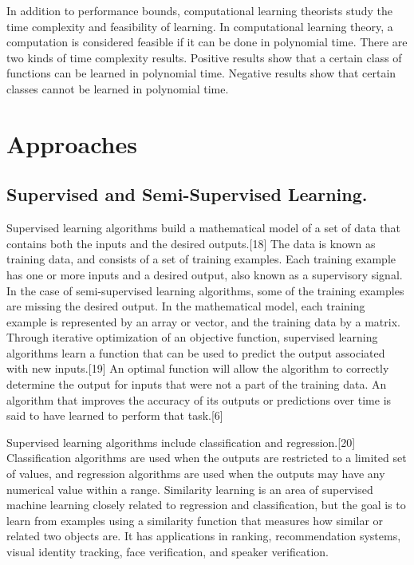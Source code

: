 \documentclass[utf8,bachelor,english]{gradu3}
\begin{document}
In addition to performance bounds, computational learning theorists study the time complexity and feasibility of learning. In computational learning theory, a computation is considered feasible if it can be done in polynomial time. There are two kinds of time complexity results. Positive results show that a certain class of functions can be learned in polynomial time. Negative results show that certain classes cannot be learned in polynomial time.
\chapter{Approaches}

\section{Supervised and Semi-Supervised Learning.}
Supervised learning algorithms build a mathematical model of a set of data that contains both the inputs and the desired outputs.[18] The data is known as training data, and consists of a set of training examples. Each training example has one or more inputs and a desired output, also known as a supervisory signal. In the case of semi-supervised learning algorithms, some of the training examples are missing the desired output. In the mathematical model, each training example is represented by an array or vector, and the training data by a matrix. Through iterative optimization of an objective function, supervised learning algorithms learn a function that can be used to predict the output associated with new inputs.[19] An optimal function will allow the algorithm to correctly determine the output for inputs that were not a part of the training data. An algorithm that improves the accuracy of its outputs or predictions over time is said to have learned to perform that task.[6]

Supervised learning algorithms include classification and regression.[20] Classification algorithms are used when the outputs are restricted to a limited set of values, and regression algorithms are used when the outputs may have any numerical value within a range. Similarity learning is an area of supervised machine learning closely related to regression and classification, but the goal is to learn from examples using a similarity function that measures how similar or related two objects are. It has applications in ranking, recommendation systems, visual identity tracking, face verification, and speaker verification.
\end{document}
